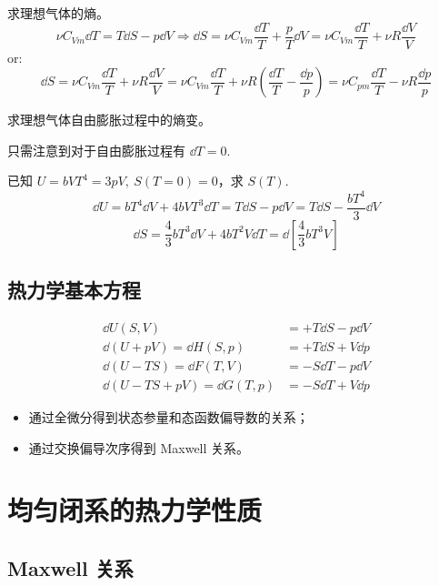 \begin{framed}
求理想气体的熵。
\[
\nu C_{Vm} \dd{T} = T \dd{S} - p \dd{V} \Rightarrow \dd{S} = \nu C_{Vm} \frac{\dd{T}}{T} + \frac{p}{T} \dd{V} = \nu C_{Vm} \frac{\dd{T}}{T} + \nu R \frac{\dd{V}}{V}
\]
or:
\[
\dd{S} = \nu C_{Vm} \frac{\dd{T}}{T} + \nu R \frac{\dd{V}}{V} = \nu C_{Vm} \frac{\dd{T}}{T} + \nu R (\frac{\dd{T}}{T} - \frac{\dd{p}}{p}) = \nu C_{pm} \frac{\dd{T}}{T} - \nu R \frac{\dd{p}}{p}
\]
\end{framed}

\begin{framed}
求理想气体自由膨胀过程中的熵变。

只需注意到对于自由膨胀过程有 $\dd{T} = 0$.
\end{framed}

\begin{framed}
已知 $U = b V T^4 = 3 p V,\ S(T = 0) = 0$，求 $S(T)$.
\[
\dd{U} = b T^4 \dd{V} + 4 b V T^3 \dd{T} = T \dd{S} - p \dd{V} = T \dd{S} - \frac{b T^4}{3} \dd{V}
\]\[
\dd{S} = \frac{4}{3} b T^3 \dd{V} + 4 b T^2 V \dd{T} = \dd{\left[\frac{4}{3} b T^3 V\right]}
\]
\end{framed}

\subsection{热力学基本方程}

\begin{align*}
    \dd{U(S, V)} & = + T \dd{S} - p \dd{V}\\
    \dd{(U + pV)} = \dd{H(S, p)} & = + T \dd{S} + V \dd{p}\\
    \dd{(U - TS)} = \dd{F(T, V)} & = - S \dd{T} - p \dd{V}\\
    \dd{(U - TS + pV)} = \dd{G(T, p)} & = - S \dd{T} + V \dd{p}
\end{align*}

\begin{itemize}
    \item 通过全微分得到状态参量和态函数偏导数的关系；
    \item 通过交换偏导次序得到 Maxwell 关系。
\end{itemize}

\section{均匀闭系的热力学性质}

\subsection{Maxwell 关系}

